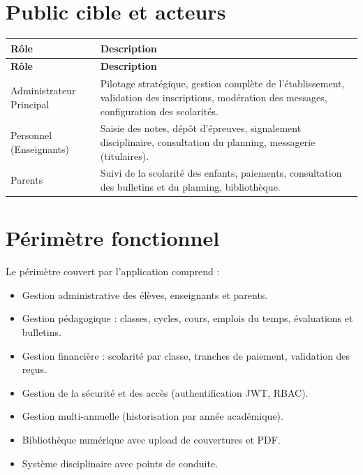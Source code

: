 \documentclass[12pt,a4paper]{report}
\begin{document}
\section{Public cible et acteurs}
\begin{longtable}{|p{4cm}|p{10.5cm}|}
\hline
\textbf{Rôle} & \textbf{Description} \\
\hline
\endfirsthead
\hline
\textbf{Rôle} & \textbf{Description} \\
\hline
\endhead
Administrateur Principal & Pilotage stratégique, gestion complète de l'établissement, validation des inscriptions, modération des messages, configuration des scolarités. \\
\hline
Personnel (Enseignants) & Saisie des notes, dépôt d'épreuves, signalement disciplinaire, consultation du planning, messagerie (titulaires). \\
\hline
Parents & Suivi de la scolarité des enfants, paiements, consultation des bulletins et du planning, bibliothèque. \\
\hline
\end{longtable}
 
\section{Périmètre fonctionnel}
Le périmètre couvert par l'application comprend :
\begin{itemize}[leftmargin=*]
    \item Gestion administrative des élèves, enseignants et parents.
    \item Gestion pédagogique : classes, cycles, cours, emplois du temps, évaluations et bulletins.
    \item Gestion financière : scolarité par classe, tranches de paiement, validation des reçus.
    \item Gestion de la sécurité et des accès (authentification JWT, RBAC).
    \item Gestion multi-annuelle (historisation par année académique).
    \item Bibliothèque numérique avec upload de couvertures et PDF.
    \item Système disciplinaire avec points de conduite.
\end{itemize}
\end{document}
